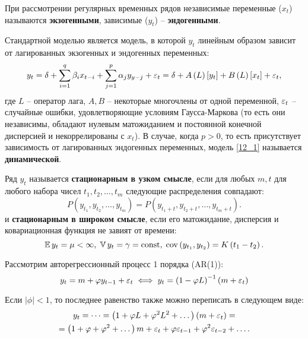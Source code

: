 
При рассмотрении регулярных временных рядов независимые переменные ($x_t$) называются \textbf{экзогенными}, зависимые ($y_t$) -- \textbf{эндогенными}.

Стандартной моделью является модель, в которой $y_t$ линейным образом зависит от лагированных экзогенных и эндогенных переменных:
\begin{equation}
\label{12_1}
    y_t =
    \delta + \sum_{i=1}^{q} \beta_i x_{t-i} + \sum_{j=1}^{p} \alpha_j y_{y-j} + \varepsilon_t =
    \delta + A\left( L \right) \left[ y_t \right] + B\left( L \right) \left[ x_t \right] + \varepsilon_t,
\end{equation}
где $L$ -- оператор лага, $A, B$ -- некоторые многочлены от одной переменной, $\varepsilon_t$ -- случайные ошибки, удовлетворяющие условиям Гаусса-Маркова (то есть они независимы, обладают нулевым матожиданием и постоянной конечной дисперсией и некоррелированы с $x_t$). В случае, когда $p > 0$, то есть присутствует зависимость от лагированных эндогенных переменных, модель \eqref{12_1} называется \textbf{динамической}.


\begin{definition}[Стационарность]
    Ряд $y_t$ называется \textbf{стационарным в узком смысле}, если для любых $m, t$ для любого набора чисел $t_1, t_2, \dots, t_m$ следующие распределения совпадают:
    \begin{equation*}
        P\left( y_{t_1}, y_{t_2}, \dots, y_{t_m} \right) =
        P\left( y_{t_1+t}, y_{t_2+t}, \dots, y_{t_m+t} \right).
    \end{equation*}
    и \textbf{стационарным в широком смысле}, если его матожидание, дисперсия и ковариационная функция не завият от времени:
    \begin{equation*}
        \operatorname{\mathbb{E}} y_{t} = \mu < \infty,\;
        \operatorname{\mathbb{V}} y_t = \gamma = \mathrm{const},\;
        \operatorname{cov}\left( y_{t_1}, y_{t_2} \right) = K\left( t_1 - t_2 \right).
    \end{equation*}
\end{definition}

Рассмотрим авторегрессионный процесс 1 порядка (AR(1)):
\begin{equation}
\label{12_2}
    y_{t} = m + \varphi y_{t-1} + \varepsilon_t
    \iff
    y_t = \left( 1 - \varphi L \right)^{-1} \left( m + \varepsilon_t \right)
\end{equation}

Если $|\phi| < 1$, то последнее равенство также можно переписать в следующем виде:
\begin{gather*}
    y_t = \dots =
    \left( 1 + \varphi L + \varphi^2 L^2 + \dots \right) \left( m + \varepsilon_t \right) =\\=
    \left( 1 + \varphi + \varphi^2 + \dots \right) m + \varepsilon_t + \varphi \varepsilon_{t-1} + \varphi^2 \varepsilon_{t-2} + \dots.
\end{gather*}

